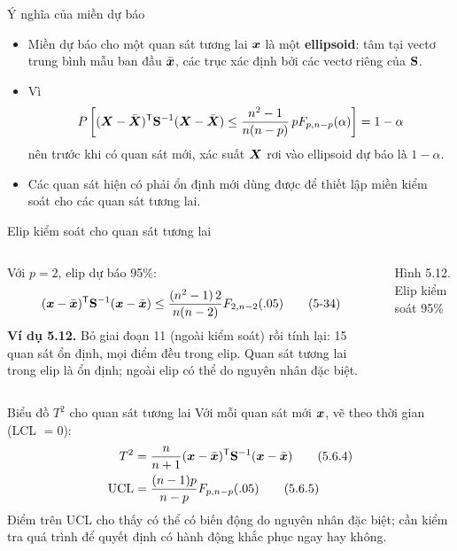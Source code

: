 \begin{frame}{Ý nghĩa của miền dự báo}
  \begin{itemize}
    \item Miền dự báo cho một quan sát tương lai \(\boldsymbol{x}\) là một \textbf{ellipsoid}: tâm tại vectơ trung bình mẫu ban đầu \(\bar{\boldsymbol{x}}\), các trục xác định bởi các vectơ riêng của \(\mathbf{S}\).
    \item Vì
      \begin{equation*}
        P\left[(\boldsymbol{X}-\bar{\boldsymbol{X}})^{\mathsf T}\mathbf{S}^{-1}(\boldsymbol{X}-\bar{\boldsymbol{X}})\le\frac{n^2-1}{n(n-p)}\,pF_{p,n-p}(\alpha)\right]=1-\alpha
      \end{equation*}
      nên trước khi có quan sát mới, xác suất \(\boldsymbol{X}\) rơi vào ellipsoid dự báo là \(1-\alpha\).
    \item Các quan sát hiện có phải \alert{ổn định} mới dùng được để thiết lập miền kiểm soát cho các quan sát tương lai.
  \end{itemize}
\end{frame}

\begin{frame}{Elip kiểm soát cho quan sát tương lai}
  \begin{columns}[T]
    Với \(p=2\), elip dự báo 95\%:
    {\small\begin{equation*}
      (\boldsymbol{x}-\bar{\boldsymbol{x}})^{\mathsf T}\mathbf{S}^{-1}(\boldsymbol{x}-\bar{\boldsymbol{x}})\le\frac{(n^2-1)\,2}{n(n-2)}F_{2,n-2}(.05)
      \tag{5-34}
    \end{equation*}}
    \textbf{Ví dụ 5.12.} Bỏ giai đoạn 11 (ngoài kiểm soát) rồi tính lại: 15 quan sát ổn định, mọi điểm đều trong elip. Quan sát tương lai trong elip là ổn định; ngoài elip có thể do nguyên nhân đặc biệt.
    \centering
    \resizebox{\linewidth}{!}{}

    {\scriptsize Hình 5.12. Elip kiểm soát 95\%}
  \end{columns}
\end{frame}

\begin{frame}{Biểu đồ \(T^2\) cho quan sát tương lai}
  Với mỗi quan sát mới \(\boldsymbol{x}\), vẽ theo thời gian (LCL \(=0\)):
  \begin{align*}
    T^2&=\frac{n}{n+1}(\boldsymbol{x}-\bar{\boldsymbol{x}})^{\mathsf T}\mathbf{S}^{-1}(\boldsymbol{x}-\bar{\boldsymbol{x}})\tag{5.6.4}\\
    \mathrm{UCL}&=\frac{(n-1)p}{n-p}F_{p,n-p}(.05)\tag{5.6.5}
  \end{align*}
  Điểm trên UCL cho thấy có thể có biến động do nguyên nhân đặc biệt; cần kiểm tra quá trình để quyết định có hành động khắc phục ngay hay không.
\end{frame}

